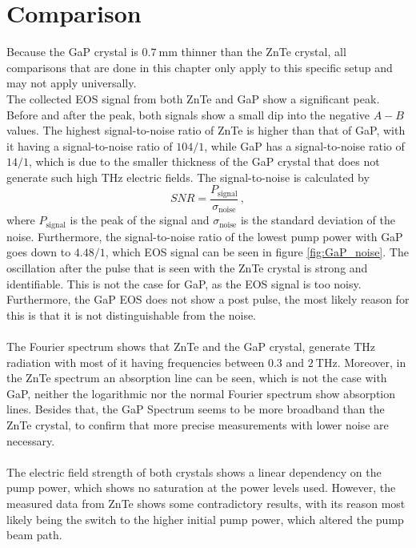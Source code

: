 \section{Comparison}
Because the GaP crystal is $\SI{0.7}{\milli\meter}$ thinner than the ZnTe crystal, all comparisons that are done in this chapter only apply to this specific setup and may not apply universally.
\\
The collected EOS signal from both ZnTe and GaP show a significant peak.
Before and after the peak, both signals show a small dip into the negative $A-B$ values.
The highest signal-to-noise ratio of ZnTe is higher than that of GaP, with it having a signal-to-noise ratio of $104/1$, while GaP has a signal-to-noise ratio of $14/1$, which is due to the smaller thickness of the GaP crystal that does not generate such high $\si{\tera\hertz}$ electric fields.
The signal-to-noise is calculated by 
\begin{equation}
    SNR = \frac{P_\text{signal}}{\sigma_\text{noise}}\, ,
\end{equation}
where $P_\text{signal}$ is the peak of the signal and $\sigma_\text{noise}$ is the standard deviation of the noise.
Furthermore, the signal-to-noise ratio of the lowest pump power with GaP goes down to $4.48/1$, which EOS signal can be seen in figure \ref{fig:GaP_noise}.
The oscillation after the pulse that is seen with the ZnTe crystal is strong and identifiable.
This is not the case for GaP, as the EOS signal is too noisy.
Furthermore, the GaP EOS does not show a post pulse, the most likely reason for this is that it is not distinguishable from the noise.
\\\\
The Fourier spectrum shows that ZnTe and the GaP crystal, generate $\si{\tera\hertz}$ radiation with most of it having frequencies between $0.3$ and $\SI{2}{\tera\hertz}$.
Moreover, in the ZnTe spectrum an absorption line can be seen, which is not the case with GaP, neither the logarithmic nor the normal Fourier spectrum show absorption lines.
Besides that, the GaP Spectrum seems to be more broadband than the ZnTe crystal, to confirm that more precise measurements with lower noise are necessary.
\\\\
The electric field strength of both crystals shows a linear dependency on the pump power, which shows no saturation at the power levels used.
However, the measured data from ZnTe shows some contradictory results, with its reason most likely being the switch to the higher initial pump power, which altered the pump beam path.

